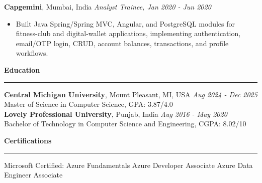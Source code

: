 \documentclass[11pt,letterpaper]{article}
\newcommand{\ressection}[1]{\Needspace{6\baselineskip}\vspace{8pt}\par\textbf{#1}\par\vspace{2pt}\hrule\vspace{5pt}}
\begin{document}
\textbf{Capgemini}, Mumbai, India \hfill \textit{Analyst Trainee, Jan 2020 - Jun 2020}
\begin{itemize}
  \item Built Java Spring/Spring MVC, Angular, and PostgreSQL modules for fitness-club and digital-wallet applications, implementing authentication, email/OTP login, CRUD, account balances, transactions, and profile workflows.
\end{itemize}

\ressection{Education}
\textbf{Central Michigan University}, Mount Pleasant, MI, USA \hfill \textit{Aug 2024 - Dec 2025}\\
Master of Science in Computer Science, GPA: 3.87/4.0\\[2pt]
\textbf{Lovely Professional University}, Punjab, India \hfill \textit{Aug 2016 - May 2020}\\
Bachelor of Technology in Computer Science and Engineering, CGPA: 8.02/10

\ressection{Certifications}
Microsoft Certified: Azure Fundamentals \textbar{} Azure Developer Associate \textbar{} Azure Data Engineer Associate
\end{document}
